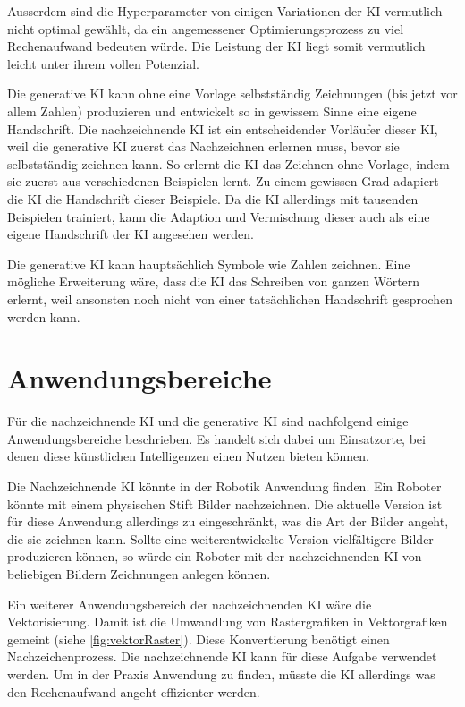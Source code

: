Ausserdem sind die Hyperparameter von einigen Variationen der KI vermutlich
nicht optimal gewählt, da ein angemessener Optimierungsprozess zu viel
Rechenaufwand bedeuten würde. Die Leistung der KI liegt somit vermutlich leicht
unter ihrem vollen Potenzial.

Die generative KI kann ohne eine Vorlage selbstständig Zeichnungen (bis jetzt
vor allem Zahlen) produzieren und entwickelt so in gewissem Sinne eine eigene
Handschrift. Die nachzeichnende KI ist ein entscheidender Vorläufer dieser KI,
weil die generative KI zuerst das Nachzeichnen erlernen muss, bevor sie
selbstständig zeichnen kann. So erlernt die KI das Zeichnen ohne Vorlage, indem
sie zuerst aus verschiedenen Beispielen lernt. Zu einem gewissen Grad adapiert
die KI die Handschrift dieser Beispiele. Da die KI allerdings mit tausenden
Beispielen trainiert, kann die Adaption und Vermischung dieser auch als eine
eigene Handschrift der KI angesehen werden.

Die generative KI kann hauptsächlich Symbole wie Zahlen zeichnen. Eine mögliche
Erweiterung wäre, dass die KI das Schreiben von ganzen Wörtern erlernt, weil
ansonsten noch nicht von einer tatsächlichen Handschrift gesprochen werden kann.


\section{Anwendungsbereiche}\label{chap:d_anwendung} Für die nachzeichnende KI
und die generative KI sind nachfolgend einige Anwendungsbereiche beschrieben. Es
handelt sich dabei um Einsatzorte, bei denen diese künstlichen Intelligenzen
einen Nutzen bieten können.

Die Nachzeichnende KI könnte in der Robotik Anwendung finden. Ein Roboter
könnte mit einem physischen Stift Bilder nachzeichnen. Die aktuelle Version ist
für diese Anwendung allerdings zu eingeschränkt, was die Art der Bilder angeht,
die sie zeichnen kann. Sollte eine weiterentwickelte Version vielfältigere
Bilder produzieren können, so würde ein Roboter mit der nachzeichnenden KI von
beliebigen Bildern Zeichnungen anlegen können.

Ein weiterer Anwendungsbereich der nachzeichnenden KI wäre die Vektorisierung.
Damit ist die Umwandlung von Rastergrafiken in Vektorgrafiken gemeint (siehe
\autoref{fig:vektorRaster}). Diese Konvertierung benötigt einen
Nachzeichenprozess. Die nachzeichnende KI kann für diese Aufgabe verwendet
werden. Um in der Praxis Anwendung zu finden, müsste die KI allerdings was den
Rechenaufwand angeht effizienter werden.

